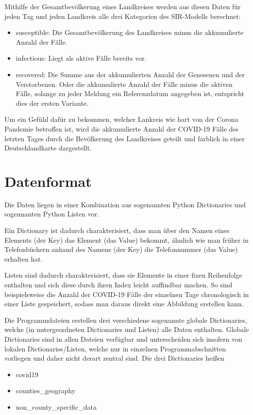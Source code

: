 Mithilfe der Gesamtbevölkerung eines Landkreises werden aus diesen Daten für jeden Tag und jeden Landkreis alle drei Kategorien des SIR-Modells berechnet:

\begin{itemize}
    \item \glqq{}susceptible\grqq{}: Die Gesamtbevölkerung des Landkreises minus die akkumulierte Anzahl der Fälle.
    \item \glqq{}infectious\grqq{}: Liegt als aktive Fälle bereits vor.
    \item \glqq{}recovered\grqq{}:
    Die Summe aus der akkumulierten Anzahl der Genesenen und der Verstorbenen. Oder die akkumulierte Anzahl der Fälle minus die aktiven Fälle, solange zu jeder Meldung ein Referenzdatum angegeben ist, entspricht dies der ersten Variante.
\end{itemize}

Um ein Gefühl dafür zu bekommen, welcher Lankreis wie hart von der Corona Pandemie betroffen ist, wird die akkumulierte Anzahl der COVID-19 Fälle des letzten Tages durch die Bevölkerung des Landkreises geteilt und farblich in einer Deutschlandkarte dargestellt.

\section{Datenformat}
Die Daten liegen in einer Kombination aus sogenannten Python Dictionaries und sogennanten Python Listen vor.

Ein Dictionary ist dadurch charakterisiert, dass man über den Namen eines Elements (der \glqq{}Key\grqq{}) das Element (das \glqq{}Value\grqq{}) bekommt, ähnlich wie man früher in Telefonbüchern anhand des Namens (der Key) die Telefonnummer (das Value) erhalten hat.

Listen sind dadurch charakterisiert, dass sie Elemente in einer fixen Reihenfolge enthalten und sich diese durch ihren Index leicht auffindbar machen. So sind beispielsweise die Anzahl der COVID-19 Fälle der einzelnen Tage chronologisch in einer Liste gespeichert, sodass man daraus direkt eine Abbildung erstellen kann.


Die Programmdateien erstellen drei verschiedene sogenannte globale Dictionaries, welche (in untergeordneten Dictionaries und Listen) alle Daten enthalten. Globale Dictionaries sind in allen Dateien verfügbar und unterscheiden sich insofern von lokalen Dictionaries/Listen, welche nur in einzelnen Programmabschnitten vorliegen und daher nicht derart zentral sind.
Die drei Dictionaries heißen
\begin{itemize}
    \item covid19
    \item counties\_geography
    \item non\_county\_specific\_data
\end{itemize}

